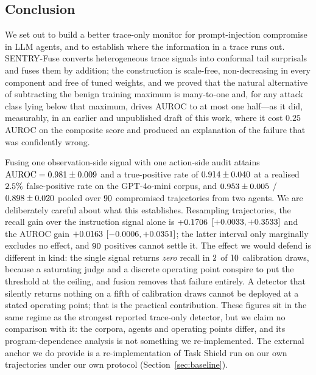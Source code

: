 \documentclass[preprint,12pt,number]{elsarticle}
\theoremstyle{definition}
\begin{document}
\subsection{Conclusion}\label{sec:conclusion}

We set out to build a better trace-only monitor for prompt-injection compromise
in LLM agents, and to establish where the information in a trace runs out.
SENTRY-Fuse converts heterogeneous trace signals into conformal tail surprisals
and fuses them by addition; the construction is scale-free, non-decreasing in
every component and free of tuned weights, and we proved that the natural
alternative of subtracting the benign training maximum is many-to-one and, for any
attack class lying below that maximum, drives AUROC to at most one half---as it
did, measurably, in an earlier and unpublished draft of this work, where it cost
$0.25$ AUROC on the composite score and produced an explanation of the failure that
was confidently wrong.

Fusing one observation-side signal with one action-side audit attains
$\mathrm{AUROC} = 0.981 \pm 0.009$ and a true-positive rate of
$0.914 \pm 0.040$ at a realised $2.5\%$ false-positive rate on
the GPT-4o-mini corpus, and $0.953 \pm 0.005$ /
$0.898 \pm 0.020$ pooled over $90$ compromised trajectories from
two agents. We are deliberately careful about what this establishes. Resampling
trajectories, the recall gain over the instruction signal alone is $+0.1706$
$[+0.0033, +0.3533]$ and the AUROC gain $+0.0163$
$[-0.0006, +0.0351]$; the latter interval only marginally excludes
no effect, and $90$ positives cannot settle it. The effect we would defend is
different in kind: the single signal returns \emph{zero} recall in
$2$ of $10$ calibration draws, because a saturating judge and a
discrete operating point conspire to put the threshold at the ceiling, and fusion
removes that failure entirely. A detector that silently returns nothing on a fifth
of calibration draws cannot be deployed at a stated operating point; that is the
practical contribution. These figures sit in the same regime as the strongest
reported trace-only detector, but we claim no comparison with it: the corpora,
agents and operating points differ, and its program-dependence analysis is not
something we re-implemented. The external anchor we do provide is a
re-implementation of Task Shield run on our own trajectories under our own
protocol (Section~\ref{sec:baseline}).
\end{document}
